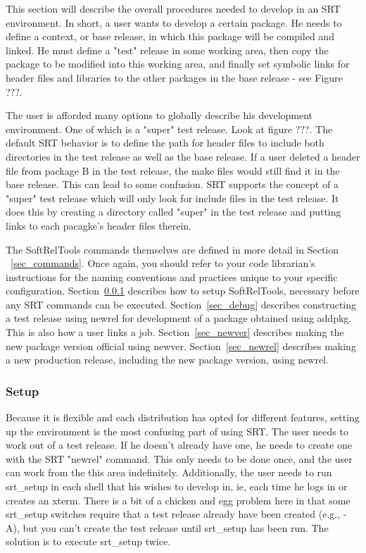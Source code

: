 \documentclass[12pt]{article}
\begin{document}
This section will describe the overall procedures needed to develop
in an SRT environment.  In short, a user wants to develop a certain
package. He needs to define a context, or base release, in which this 
package will be compiled and linked. He must define a "test" release
in some working area, then copy the package to be modified
into this working area, and finally set symbolic links for header files
and libraries to the other packages in the base release - see Figure ???. 

The user is afforded many options to globally describe his development 
environment. One of which is a "super" test release. 
Look at figure ???. The default SRT behavior is to define
the path for header files to include both directories in the test 
release as well as the base release. If a user deleted a header file from 
package B in the test release, the make files would still find it in the
base release. This can lead to some confusion. SRT supports the concept
of a "super" test release which will only look for include files in the
test release. It does this by creating a directory called "super" in the
test release and putting links to each pacagke's header files therein. 


The SoftRelTools commands themselves are defined in more
detail in Section ~\ref{sec_commands}. 
Once again, you should
refer to your code librarian's instructions for the naming conventions and
practices unique to your specific configuration. Section~\ref{sec_setup}
describes how to setup SoftRelTools, necessary before any SRT 
commands can be executed.
Section~\ref{sec_debug}                                
describes constructing a test release using {\ttfamily newrel}  
for development
of a package obtained using {\ttfamily addpkg}.  
This is also how a user links a job.
Section~\ref{sec_newver} describes making the new package version official 
using {\ttfamily newver}. Section~\ref{sec_newrel} describes making a new
production release, including the new package version, using {\ttfamily newrel}.

\subsubsection{Setup}
\label{sec_setup}
Because it is flexible and each distribution has opted for different
features, setting up the environment is the most confusing part of using 
SRT. The user needs to work out of a test release. If he doesn't already have
one, he needs to create one with the SRT "newrel" command. This only needs
to be done once, and the user can work from the this area indefinitely. 
Additionally, the user needs to run srt\_setup in each shell that his wishes
to develop in, ie, each time he logs in or creates an xterm. There is a bit
of a chicken and egg problem here in that some srt\_setup switches require that
a test release already have been created (e.g., -A), but you can't create the 
test
release until srt\_setup has been run. The solution is to execute srt\_setup
twice. 
\end{document}
